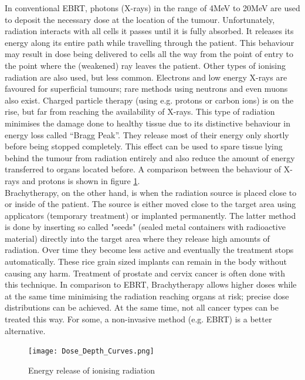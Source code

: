 In conventional EBRT, photons (X-rays) in the range of 4MeV to 20MeV are used to deposit the necessary dose at the location of the tumour.
Unfortunately, radiation interacts with all cells it passes until it is fully absorbed.
It releases its energy along its entire path while travelling through the patient.
This behaviour may result in dose being delivered to cells all the way from the point of entry to the point where the (weakened) ray leaves the patient.
Other types of ionising radiation are also used, but less common.
Electrons and low energy X-rays are favoured for superficial tumours; rare methods using neutrons and even muons also exist.
Charged particle therapy (using e.g. protons or carbon ions) is on the rise, but far from reaching the availability of X-rays.
This type of radiation minimises the damage done to healthy tissue due to its distinctive behaviour in energy loss called ``Bragg Peak''.
They release most of their energy only shortly before being stopped completely.
\cite{Nakamura2010} This effect can be used to spare tissue lying behind the tumour from radiation entirely and also reduce the amount of energy transferred to organs located before. \cite{Paganetti2005}
A comparison between the behaviour of X-rays and protons is shown in figure \ref{fig:bragg}.\\

Brachytherapy, on the other hand, is when the radiation source is placed close to or inside of the patient.
The source is either moved close to the target area using applicators (temporary treatment) or implanted permanently.
The latter method is done by inserting so called "seeds" (sealed metal containers with radioactive material) directly into the target area where they release high amounts of radiation.
Over time they become less active and eventually the treatment stops automatically.
These rice grain sized implants can remain in the body without causing any harm.
Treatment of prostate and cervix cancer is often done with this technique.
In comparison to EBRT, Brachytherapy allows higher doses while at the same time minimising the radiation reaching organs at risk; precise dose distributions can be achieved.
At the same time, not all cancer types can be treated this way.
For some, a non-invasive method (e.g. EBRT) is a better alternative.\\


\begin{figure}[!h]
	\centering
	\texttt{[image: Dose\_Depth\_Curves.png]}
	\caption[Energy release of ionising radiation]{Energy release of ionising radiation \footnotemark}
	\label{fig:bragg}
\end{figure}

